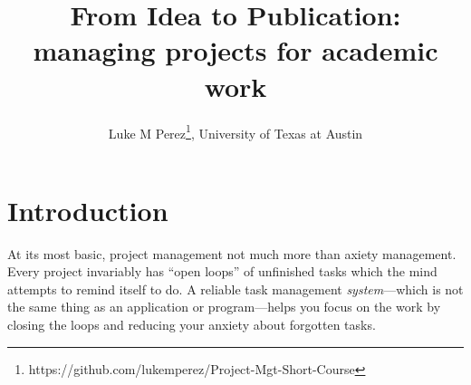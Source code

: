 \documentclass{tufte-handout}
\title{From Idea to Publication: managing projects for academic work}
\author[lmp]{Luke M Perez\thanks{https://github.com/lukemperez/Project-Mgt-Short-Course}, University of Texas at Austin}
\begin{document}
\maketitle%



\section{Introduction} %
\label{sec:intro}

At its most basic, project management not much more than axiety management. Every project invariably has ``open loops'' of unfinished tasks which the mind attempts to remind itself to do. A reliable task management \textit{system}---which is not the same thing as an application or program---helps you focus on the work by closing the loops and reducing your anxiety about forgotten tasks.



\end{document}
